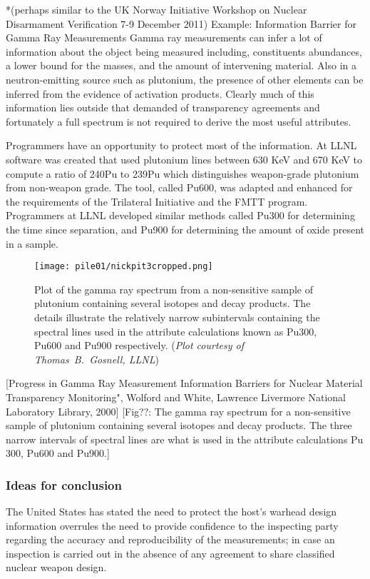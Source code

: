 \documentclass[twoside,titlepage,11pt,twocolumn,a4paper]{article}
\begin{document}
*(perhaps similar to the UK Norway Initiative Workshop on Nuclear
Disarmament Verification 7-9 December 2011) Example: Information
Barrier for Gamma Ray Measurements Gamma ray measurements can infer a
lot of information about the object being measured including,
constituents abundances, a lower bound for the masses, and the amount
of intervening material. Also in a neutron-emitting source such as
plutonium, the presence of other elements can be inferred from the
evidence of activation products. Clearly much of this information lies
outside that demanded of transparency agreements and fortunately a
full spectrum is not required to derive the most useful attributes.

Programmers have an opportunity to protect most of the information. At
LLNL software was created that used plutonium lines between 630 KeV
and 670 KeV to compute a ratio of 240Pu to 239Pu which distinguishes
weapon-grade plutonium from non-weapon grade. The tool, called Pu600,
was adapted and enhanced for the requirements of the Trilateral
Initiative and the FMTT program. Programmers at LLNL developed similar
methods called Pu300 for determining the time since separation, and
Pu900 for determining the amount of oxide present in a sample.

\begin{figure}
  \texttt{[image: pile01/nickpit3cropped.png]}
  \caption{Plot of the gamma ray spectrum from a non-sensitive sample
    of plutonium containing several isotopes and decay products. The
    details illustrate the relatively narrow subintervals containing
    the spectral lines used in the attribute calculations known as
    Pu300, Pu600 and Pu900 respectively. (\emph{Plot courtesy of
      Thomas~B.~Gosnell, LLNL})}
\end{figure}

[Progress in Gamma Ray Measurement Information Barriers for Nuclear
  Material Transparency Monitoring", Wolford and White, Lawrence
  Livermore National Laboratory Library, 2000] [Fig??: The gamma ray
  spectrum for a non-sensitive sample of plutonium containing several
  isotopes and decay products. The three narrow intervals of spectral
  lines are what is used in the attribute calculations Pu 300, Pu600
  and Pu900.]

\subsubsection{Ideas for conclusion}
The United States has stated the need to protect the host's warhead
design information overrules the need to provide confidence to the
inspecting party regarding the accuracy and reproducibility of the
measurements; in case an inspection is carried out in the absence of
any agreement to share classified nuclear weapon design.
\end{document}
